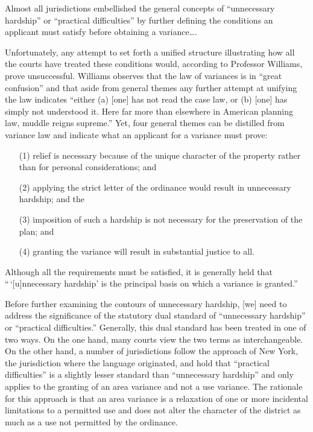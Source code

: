 Almost all jurisdictions embellished the general concepts of ``unnecessary
hardship'' or ``practical difficulties'' by further defining the conditions an
applicant must satisfy before obtaining a variance\ldots .

Unfortunately, any attempt to set forth a unified structure illustrating how all
the courts have treated these conditions would, according to Professor Williams,
prove unsuccessful. Williams observes that the law of variances is in ``great
confusion'' and that aside from general themes any further attempt at unifying
the law indicates ``either (a) [one] has not read the case law, or (b) [one] has
simply not understood it. Here far more than elsewhere in American planning law,
muddle reigns supreme.'' Yet, four general themes can be distilled from variance
law and indicate what an applicant for a variance must prove:
\begin{itemize}
\item[(1)] relief is necessary because of the unique character of the property
rather than for personal considerations; and

\item[(2)] applying the strict letter of the ordinance would result in
unnecessary hardship; and the

\item[(3)] imposition of such a hardship is not necessary for the preservation
of the plan; and

\item[(4)] granting the variance will result in substantial justice to all.
\end{itemize}
Although all the requirements must be satisfied, it is generally held that
``\,`[u]nnecessary hardship' is the principal basis on which a variance is
granted.'' 

Before further examining the contours of unnecessary hardship,
[we]
need to address the significance of the statutory dual standard of ``unnecessary
hardship'' or ``practical difficulties.'' Generally, this dual standard has been
treated in one of two ways. On the one hand, many courts view the two terms as
interchangeable. On the other hand, a number of jurisdictions follow the
approach of New York, the jurisdiction where the language originated, and hold
that ``practical difficulties'' is a slightly lesser standard than ``unnecessary
hardship'' and only applies to the granting of an area variance and not a use
variance. The rationale for this approach is that an area variance is a
relaxation of one or more incidental limitations to a permitted use and does not
alter the character of the district as much as a use not permitted by the
ordinance.

